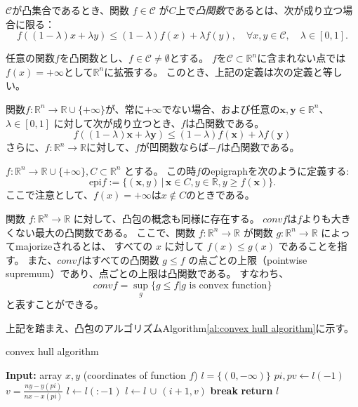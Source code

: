 \begin{dfn}
    $\mathcal{C}$が凸集合であるとき、関数 $f \in \mathcal{C}$ が$C$上で\textit{凸関数}であるとは、次が成り立つ場合に限る：
    \[
        f((1 - \lambda)x + \lambda y) \le (1 - \lambda) f(x) + \lambda f(y), \quad \forall x, y \in \mathcal{C}, \quad \lambda \in [0, 1].
    \] 
\end{dfn}

任意の関数$f$を凸関数とし、$f \in \mathcal{C} \ne \emptyset$とする。
$f$を$\mathcal{C} \subset \mathbb{R}^n$に含まれない点では$f(x) = +\infty$として$\mathbb{R}^n$に拡張する。
このとき、上記の定義は次の定義と等しい。

\begin{dfn}
関数$f: \mathbb{R}^n \to \mathbb{R} \cup \{+ \infty\}$が、常に$+ \infty$でない場合、および任意の$\bm{x}, \bm{y} \in \mathbb{R}^n$、$\lambda \in [0, 1]$ に対して次が成り立つとき、$f$は凸関数である。
\[
f((1 - \lambda)\bm{x} + \lambda \bm{y}) \le (1 - \lambda) f(\bm{x}) + \lambda f(\bm{y})
\]
さらに、$f: \mathbb{R}^n \to \mathbb{R}$に対して、$f$が凹関数ならば$-f$は凸関数である。
\end{dfn}

\begin{dfn}
    $f: \mathbb{R}^n \to \mathbb{R} \cup \{ +\infty\},  C \subset \mathbb{R}^n$ とする。
    この時$f$のepigraphを次のように定義する:
    \[
    \text{epi} f := \{(\bm{x},  y) \, | \, \bm{x} \in C,  y \in \mathbb{R},  y \ge f(\bm{x}) \}.
    \]
    ここで注意として、$f(x) = +\infty$は$x \notin C$のときである。
\end{dfn}


関数 \( f : \mathbb{R}^n \to \mathbb{R} \) に対して、凸包の概念も同様に存在する。
$conv f$は$f$よりも大きくない最大の凸関数である。
ここで、関数 $f: \mathbb{R}^n \to \mathbb{R}$ が関数 $g: \mathbb{R}^n \to \mathbb{R}$ によってmajorizeされるとは、
すべての $x$ に対して $f(x) \leq g(x)$ であることを指す。
また、$conv f$はすべての凸関数 $g \leq f$ の点ごとの上限（pointwise supremum）であり、点ごとの上限は凸関数である。
すなわち、
\[
    conv f = \sup_g \{ g \le f | g \text{ is convex function}\}
\]
と表すことができる。

上記を踏まえ、凸包のアルゴリズムAlgorithm\ref{al:convex hull algorithm}に示す。



\begin{algorithm}[tb]
    \caption{convex hull algorithm}
    \label{al:convex hull algorithm}
    \begin{algorithmic}[1]
        \State \textbf{Input:} array $x, y$ (coordinates of function $f$)
        \State $l = \{(0, -\infty)\}$ 
                \State $pi, pv \gets l(-1)$
                \State $v = \frac{ny - y(pi)} {nx - x(pi)} $
                    \State $l \gets l(:-1)$
                \Else
                    \State $l \gets l \, \cup \, (i+1, v)$
                    \State \textbf{break}
                \EndIf
            \EndWhile
        \EndFor
        \State \textbf{return} $l$
    \end{algorithmic}
\end{algorithm}

